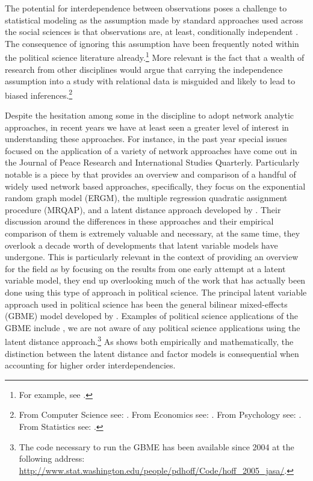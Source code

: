 The potential for interdependence between observations poses a challenge to statistical modeling as the assumption made by standard approaches used across the social sciences is that observations are, at least, conditionally independent \citep{snijders:2011}. The consequence of ignoring this assumption have been frequently noted within the political science literature already.\footnote{For example, see \citet{beck:etal:1998,signorino:1999,hoff:ward:2004,franzese:hayes:2007,cranmer:desmarais:2011,erikson:pinto:2014}.} More relevant is the fact that a wealth of research from other disciplines would argue that carrying the independence assumption into a study with relational data is misguided and likely to lead to biased inferences.\footnote{From Computer Science see: \citet{bonabeau:2002,brandes:erlebach:2005}. From Economics see: \citet{goyal:2012,jackson:2014}. From Psychology see: \citet{pattison:wasserman:1999,kenny:etal:2006}. From Statistics see: \citet{snijders:1996,hoff:etal:2002}.} 

Despite the hesitation among some in the discipline to adopt network analytic approaches, in recent years we have at least seen a greater level of interest in understanding these approaches. For instance, in the past year special issues focused on the application of a variety of network approaches have come out in the Journal of Peace Research and International Studies Quarterly. Particularly notable is a piece by \citet{cranmer:etal:2016} that provides an overview and comparison of a handful of widely used network based approaches, specifically, they focus on the exponential random graph model (ERGM), the multiple regression quadratic assignment procedure (MRQAP), and a latent distance approach developed by \citet{hoff:etal:2002}. Their discussion around the differences in these approaches and their empirical comparison of them is extremely valuable and necessary, at the same time, they overlook a decade worth of developments that latent variable models have undergone. This is particularly relevant in the context of providing an overview for the field as by focusing on the results from one early attempt at a latent variable model, they end up overlooking much of the work that has actually been done using this type of approach in political science. The principal latent variable approach used in political science has been the general bilinear mixed-effects (GBME) model developed by \citet{hoff:2005}. Examples of political science applications of the GBME include \citet{hoff:ward:2004,ward:etal:2007,metternich:etal:2015}, we are not aware of any political science applications using the latent distance approach.\footnote{The code necessary to run the GBME has been available since 2004 at the following address: \url{http://www.stat.washington.edu/people/pdhoff/Code/hoff_2005_jasa/}.} As \citet{hoff:2008} shows both empirically and mathematically, the distinction between the latent distance and factor models is consequential when accounting for higher order interdependencies.

